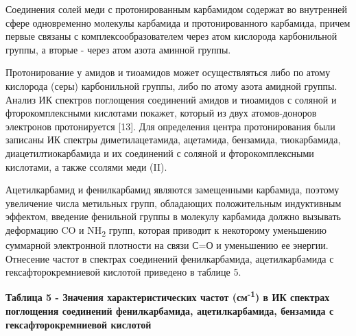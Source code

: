 Соединения солей меди с протонированным карбамидом содержат во
внутренней сфере одновременно молекулы карбамида и протонированного
карбамида, причем первые связаны с комплексообразователем через атом
кислорода карбонильной группы, а вторые - через атом азота аминной
группы.

Протонирование у амидов и тиоамидов может осуществляться либо по атому
кислорода (серы) карбонильной группы, либо по атому азота амидной
группы. Анализ ИК спектров поглощения соединений амидов и тиоамидов с
соляной и фторокомплексными кислотами покажет, который из двух
атомов-доноров электронов протонируется {[}13{]}. Для определения центра
протонирования были записаны ИК спектры диметилацетамида, ацетамида,
бензамида, тиокарбамида, диацетилтиокарбамида и их соединений с соляной
и фторокомплексными кислотами, а также ссолями меди (II).

Ацетилкарбамид и фенилкарбамид являются замещенными карбамида, поэтому
увеличение числа метильных групп, обладающих положительным индуктивным
эффектом, введение фенильной группы в молекулу карбамида должно вызывать
деформацию CO и NH\textsubscript{2} групп, которая приводит к некоторому
уменьшению суммарной электронной плотности на связи С=О и уменьшению ее
энергии. Отнесение частот в спектрах соединений фенилкарбамида,
ацетилкарбамида с гексафторокремниевой кислотой приведено в таблице 5.

\textbf{Таблица 5 - Значения характеристических частот
(см\textsuperscript{-1}) в ИК спектрах поглощения соединений
фенилкарбамида, ацетилкарбамида, бензамида с гексафторокремниевой
кислотой}

